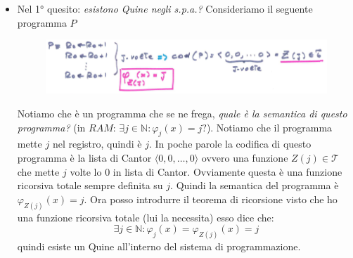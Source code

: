 \documentclass{article}
\begin{document}
\begin{itemize}
    \item Nel 1° quesito: \textit{esistono Quine negli s.p.a.?} Consideriamo il seguente
          programma $P$
          \begin{figure}[H]
              \centering
              \includegraphics[scale=0.5]{images/P_teoremaric.png}
          \end{figure}
          Notiamo che è un programma che se ne frega, \textit{quale è la semantica di questo
              programma?} (in $RAM$: $\exists j\in\mathbb{N}:\varphi_j(x)=j?$). Notiamo che il programma mette $j$
          nel registro, quindi è $j$.
          In poche parole la codifica di questo programma è la lista di Cantor $\langle0,0,\dots, 0\rangle$
          ovvero una funzione $Z(j)\in\mathcal{T}$ che mette $j$ volte lo 0 in lista di Cantor. Ovviamente
          questa è una funzione ricorsiva totale sempre definita su $j$.
          Quindi la semantica del programma è $\varphi_{Z(j)}(x)=j$.
          Ora posso introdurre il teorema di ricorsione visto che ho una funzione ricorsiva totale (lui
          la necessita) esso dice che:
          $$\exists j\in\mathbb{N}:\varphi_j(x)=\varphi_{Z(j)}(x)=j$$
          quindi esiste un Quine all'interno del sistema di programmazione.


\end{itemize}
\end{document}
